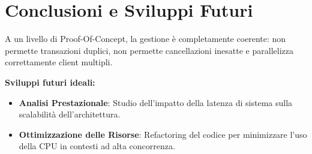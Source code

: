 \documentclass[a4paper,12pt]{article}
\begin{document}
\section{Conclusioni e Sviluppi Futuri}
A un livello di Proof-Of-Concept, la gestione è completamente coerente: non permette transazioni duplici, non permette cancellazioni inesatte e parallelizza correttamente client multipli.

\noindent \textbf{Sviluppi futuri ideali:}
\begin{itemize}
    \item \textbf{Analisi Prestazionale}: Studio dell'impatto della latenza di sistema sulla scalabilità dell'architettura.
    \item \textbf{Ottimizzazione delle Risorse}: Refactoring del codice per minimizzare l'uso della CPU in contesti ad alta concorrenza.
\end{itemize}
\end{document}
